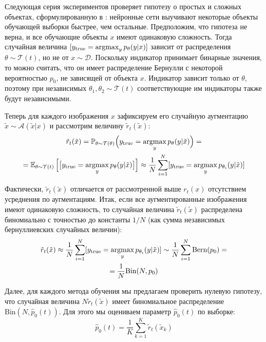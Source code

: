 Следующая серия экспериментов проверяет гипотезу о простых и сложных объектах, сформулированную в \cite{memorization}: нейронные сети выучивают некоторые объекты обучающей выборки быстрее, чем остальные. Предположим, что гипотеза не верна, и все обучающие объекты $x$ имеют одинаковую сложность. Тогда случайная величина $[y_{\text{true}} = \operatorname*{argmax}_{y} p_{\theta}(y|x)]$ зависит от распределения $\theta \sim \mathcal{T}(t)$, но не от $x \sim \mathcal{D}$. Поскольку индикатор принимает бинарные значения, то можно считать, что он имеет распределение Бернулли с некоторой вероятностью $p_0$, не зависящей от объекта $x$. Индикатор зависит только от $\theta$, поэтому при независимых $\theta_1, \theta_2 \sim \mathcal{T}(t)$ соответствующие им индикаторы также будут независимыми.

Теперь для каждого изображения $x$ зафиксируем его случайную аугментацию $\tilde{x} \sim \mathcal{A}(\tilde{x}|x)$ и рассмотрим величину $\tilde{r}_t(\tilde{x})$:
\begin{equation}
\begin{gathered}
    \tilde{r}_t(\tilde{x}) = \mathbb{P}_{\theta \sim \mathcal{T}(\theta)} \Big(y_{\text{true}} = \operatorname*{argmax}_{y} p_{\theta}(y|\tilde{x})\Big) = \\
    = \operatorname{\mathbb{E}}_{\theta \sim \mathcal{T}(t)} \Big[\big[y_{\text{true}} = \operatorname*{argmax}_{y} p_{\theta}(y|\tilde{x})\big]\Big] \approx \frac{1}{N} \sum_{i=1}^N [y_{\text{true}} = \operatorname*{argmax}_{y} p_{\theta_i}(y|\tilde{x})]
\end{gathered}
\end{equation}

\noindent
Фактически, $\tilde{r}_t(\tilde{x})$ отличается от рассмотренной выше $r_t(x)$ отсутствием \linebreak усреднения по аугментациям. Итак, если все аугментированные изображения имеют одинаковую сложность, то случайная величина $\tilde{r}_t(\tilde{x})$ распределена биномиально с точностью до константы $1/N$ (как сумма независимых бернуллиевских случайных величин):
\begin{equation}
\begin{gathered}
    \tilde{r}_t(\tilde{x}) \approx \frac{1}{N} \sum_{i=1}^N [y_{\text{true}} = \operatorname*{argmax}_{y} p_{\theta_i}(y|\tilde{x})] \sim \frac{1}{N} \sum_{i=1}^N \text{Bern}(p_0) = \\
    = \frac{1}{N} \text{Bin}(N, p_0)
\end{gathered}
\end{equation}

Далее, для каждого метода обучения мы предлагаем проверить нулевую гипотезу, что случайная величина $N \tilde{r}_t(\tilde{x})$ имеет биномиальное распределение $\text{Bin}(N, \widehat{p}_0(t))$. Для этого мы оцениваем параметр $\widehat{p}_0(t)$ по выборке:
\begin{equation}
    \widehat{p}_0(t) = \frac{1}{K} \sum_{k=1}^K \tilde{r}_t (\tilde{x}_k) 
\end{equation}

